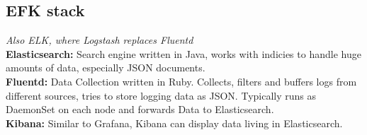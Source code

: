 \subsection{EFK stack}
\textit{Also ELK, where Logstash replaces Fluentd} \\
\textbf{Elasticsearch:} Search engine written in Java, works with indicies to handle huge amounts of data, especially JSON documents. \\
\textbf{Fluentd:} Data Collection written in Ruby. Collects, filters and buffers logs from different sources, tries to store logging data as JSON. Typically runs as DaemonSet on each node and forwards Data to Elasticsearch. \\
\textbf{Kibana:} Similar to Grafana, Kibana can display data living in Elasticsearch.
